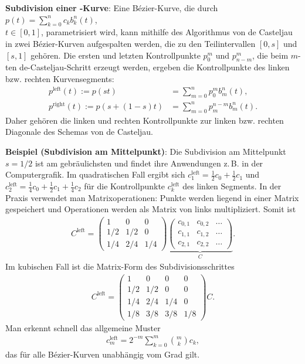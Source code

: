 \textbf{Subdivision einer -Kurve}:
Eine Bézier-Kurve, die durch $p(t) = \sum_{k=0}^n c_k b_k^n(t)$,\\
$t \in [0, 1]$, parametrisiert
wird, kann mithilfe des Algorithmus von de Casteljau in zwei Bézier-Kurven aufgespalten werden,
die zu den Teilintervallen $[0, s]$ und $[s, 1]$ gehören.
Die ersten und letzten Kontrollpunkte $p_0^m$ und $p_{n-m}^m$, die beim $m$-ten
de-Casteljau-Schritt erzeugt werden, ergeben die Kontrollpunkte des
linken bzw. rechten Kurvensegments:
\begin{align*}
    p^{\text{left}}(t) := p(st) &= \sum_{m=0}^n p_0^m b_m^n(t),\\
    p^{\text{right}}(t) := p(s + (1 - s)t) &= \sum_{m=0}^n p_m^{n-m} b_m^n(t).
\end{align*}
Daher gehören die linken und rechten Kontrollpunkte zur linken bzw. rechten Diagonale des
Schemas von de Casteljau.

\linie
\pagebreak

\textbf{Beispiel (Subdivision am Mittelpunkt)}:
Die Subdivision am Mittelpunkt $s = 1/2$ ist am gebräulichsten und findet ihre Anwendungen
z.\,B. in der Computergrafik.
Im quadratischen Fall ergibt sich $c_1^{\text{left}} = \frac{1}{2} c_0 + \frac{1}{2} c_1$ und
$c_2^{\text{left}} = \frac{1}{4} c_0 + \frac{1}{2} c_1 + \frac{1}{4} c_2$
für die Kontrollpunkte $c_k^{\text{left}}$ des linken Segments.
In der Praxis verwendet man Matrixoperationen:
Punkte werden liegend in einer Matrix gespeichert und Operationen werden als Matrix von links
multipliziert.
Somit ist
\begin{align*}
    C^{\text{left}} = \begin{pmatrix}1 & 0 & 0\\1/2& 1/2 & 0\\1/4 & 2/4 & 1/4\end{pmatrix}
    \underbrace{\begin{pmatrix}c_{0,1} & c_{0,2} & \dots\\c_{1,1} & c_{1,2} & \dots\\
    c_{2,1} & c_{2,2} & \dots\end{pmatrix}}_C.
\end{align*}
Im kubischen Fall ist die Matrix-Form des Subdivisionsschrittes
\begin{align*}
    C^{\text{left}} = \begin{pmatrix}1 & 0 & 0 & 0\\1/2& 1/2 & 0 & 0\\1/4 & 2/4 & 1/4 & 0\\
    1/8 & 3/8 & 3/8 & 1/8\end{pmatrix} C.
\end{align*}
Man erkennt schnell das allgemeine Muster
\begin{align*}
    c_m^{\text{left}} = 2^{-m} \sum_{k=0}^m \binom{m}{k} c_k,
\end{align*}
das für alle Bézier-Kurven unabhängig vom Grad gilt.

